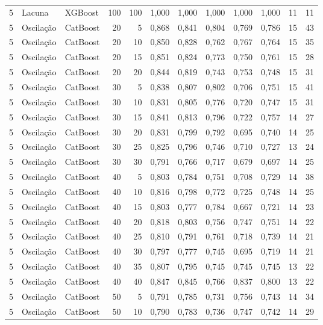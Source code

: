 \begin{longtable}{@{}rllrrrrrrrrr@{}}
5 & Lacuna & XGBoost & 100 & 100 & 1,000 & 1,000 & 1,000 & 1,000 & 1,000 & 11 & 11 \\
5 & Oscilação & CatBoost & 20 & 5 & 0,868 & 0,841 & 0,804 & 0,769 & 0,786 & 15 & 43 \\
5 & Oscilação & CatBoost & 20 & 10 & 0,850 & 0,828 & 0,762 & 0,767 & 0,764 & 15 & 35 \\
5 & Oscilação & CatBoost & 20 & 15 & 0,851 & 0,824 & 0,773 & 0,750 & 0,761 & 15 & 28 \\
5 & Oscilação & CatBoost & 20 & 20 & 0,844 & 0,819 & 0,743 & 0,753 & 0,748 & 15 & 31 \\
5 & Oscilação & CatBoost & 30 & 5 & 0,838 & 0,807 & 0,802 & 0,706 & 0,751 & 15 & 41 \\
5 & Oscilação & CatBoost & 30 & 10 & 0,831 & 0,805 & 0,776 & 0,720 & 0,747 & 15 & 31 \\
5 & Oscilação & CatBoost & 30 & 15 & 0,841 & 0,813 & 0,796 & 0,722 & 0,757 & 14 & 27 \\
5 & Oscilação & CatBoost & 30 & 20 & 0,831 & 0,799 & 0,792 & 0,695 & 0,740 & 14 & 25 \\
5 & Oscilação & CatBoost & 30 & 25 & 0,825 & 0,796 & 0,746 & 0,710 & 0,727 & 13 & 24 \\
5 & Oscilação & CatBoost & 30 & 30 & 0,791 & 0,766 & 0,717 & 0,679 & 0,697 & 14 & 25 \\
5 & Oscilação & CatBoost & 40 & 5 & 0,803 & 0,784 & 0,751 & 0,708 & 0,729 & 14 & 38 \\
5 & Oscilação & CatBoost & 40 & 10 & 0,816 & 0,798 & 0,772 & 0,725 & 0,748 & 14 & 25 \\
5 & Oscilação & CatBoost & 40 & 15 & 0,803 & 0,777 & 0,784 & 0,667 & 0,721 & 14 & 23 \\
5 & Oscilação & CatBoost & 40 & 20 & 0,818 & 0,803 & 0,756 & 0,747 & 0,751 & 14 & 22 \\
5 & Oscilação & CatBoost & 40 & 25 & 0,810 & 0,791 & 0,761 & 0,718 & 0,739 & 14 & 21 \\
5 & Oscilação & CatBoost & 40 & 30 & 0,797 & 0,777 & 0,745 & 0,695 & 0,719 & 14 & 21 \\
5 & Oscilação & CatBoost & 40 & 35 & 0,807 & 0,795 & 0,745 & 0,745 & 0,745 & 13 & 22 \\
5 & Oscilação & CatBoost & 40 & 40 & 0,847 & 0,845 & 0,766 & 0,837 & 0,800 & 13 & 22 \\
5 & Oscilação & CatBoost & 50 & 5 & 0,791 & 0,785 & 0,731 & 0,756 & 0,743 & 14 & 34 \\
5 & Oscilação & CatBoost & 50 & 10 & 0,790 & 0,783 & 0,736 & 0,747 & 0,742 & 14 & 29 \\

\end{longtable}
